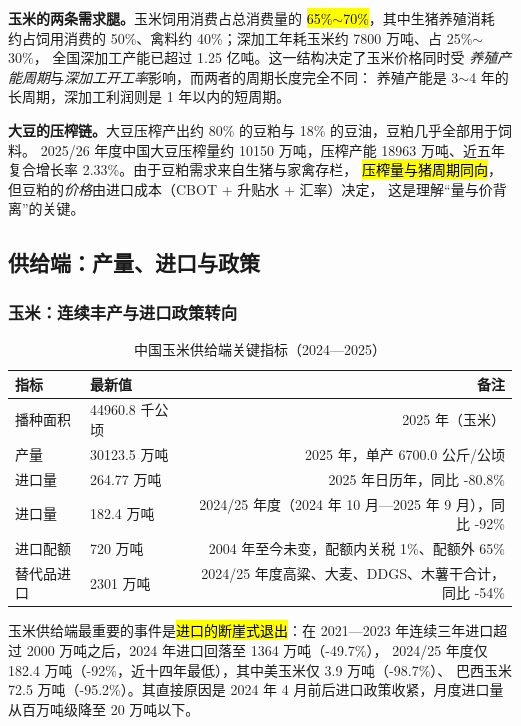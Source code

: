 \textbf{玉米的两条需求腿。}玉米饲用消费占总消费量的 \hl{65\%$\sim$70\%}，其中生猪养殖消耗
约占饲用消费的 50\%、禽料约 40\%；深加工年耗玉米约 7800 万吨、占 25\%$\sim$30\%，
全国深加工产能已超过 1.25 亿吨\cite{lswz2025corn}。这一结构决定了玉米价格同时受
\emph{养殖产能周期}与\emph{深加工开工率}影响，而两者的周期长度完全不同：
养殖产能是 3$\sim$4 年的长周期，深加工利润则是 1 年以内的短周期。

\textbf{大豆的压榨链。}大豆压榨产出约 80\% 的豆粕与 18\% 的豆油，豆粕几乎全部用于饲料。
2025/26 年度中国大豆压榨量约 10150 万吨\cite{casde123}，压榨产能 18963 万吨、近五年
复合增长率 2.33\%\cite{zhuochuang2026soy}。由于豆粕需求来自生猪与家禽存栏，
\hl{压榨量与猪周期同向}，但豆粕的\emph{价格}由进口成本（CBOT + 升贴水 + 汇率）决定，
这是理解“量与价背离”的关键。

\subsection{供给端：产量、进口与政策}
\label{sec:grain-supply}

\subsubsection{玉米：连续丰产与进口政策转向}

\begin{table}[htbp]
\centering
\small
\caption{中国玉米供给端关键指标（2024---2025）}
\label{tab:corn-supply}
\begin{tabular}{@{}llr@{}}\toprule
指标 & 最新值 & 备注 \\
\midrule
播种面积 & 44960.8 千公顷 & 2025 年（玉米） \\
产量 & 30123.5 万吨 & 2025 年，单产 6700.0 公斤/公顷 \\
进口量 & 264.77 万吨 & 2025 年日历年，同比 -80.8\% \\
进口量 & 182.4 万吨 & 2024/25 年度（2024 年 10 月---2025 年 9 月），同比 -92\% \\
进口配额 & 720 万吨 & 2004 年至今未变，配额内关税 1\%、配额外 65\% \\
替代品进口 & 2301 万吨 & 2024/25 年度高粱、大麦、DDGS、木薯干合计，同比 -54\% \\
\bottomrule
\end{tabular}
\end{table}

玉米供给端最重要的事件是\hl{进口的断崖式退出}：在 2021---2023 年连续三年进口超过
2000 万吨之后，2024 年进口回落至 1364 万吨（-49.7\%），
2024/25 年度仅 182.4 万吨（-92\%，近十四年最低），其中美玉米仅 3.9 万吨（-98.7\%）、
巴西玉米 72.5 万吨（-95.2\%）\cite{xinhu2025corn}。其直接原因是
2024 年 4 月前后进口政策收紧，月度进口量从百万吨级降至 20 万吨以下\cite{xinhu2025corn}。

